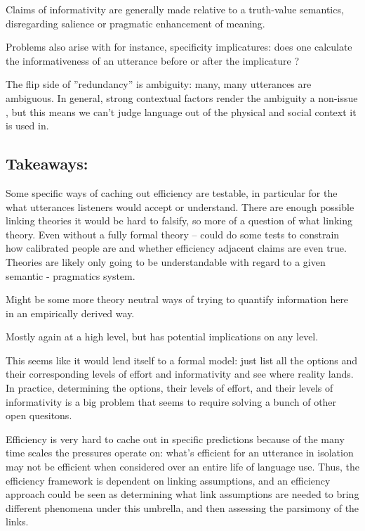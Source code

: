 \documentclass[]{article}
\begin{document}
Claims of informativity are generally made relative to a truth-value semantics, disregarding salience or pragmatic enhancement of meaning. 

Problems also arise with for instance, specificity implicatures: does one calculate the informativeness of an utterance before or after the implicature \cite{bergen}?


The flip side of ''redundancy'' is ambiguity: many, many utterances are ambiguous. In general, strong contextual factors render the ambiguity a non-issue \cite{piantadosi2012}, but this means we can't judge language out of the physical and social context it is used in. 

\subsection{Takeaways:}
Some specific ways of caching out efficiency are testable, in particular for the what utterances listeners would accept or understand. There are enough possible linking theories it would be hard to falsify, so more of a question of what linking theory. 
Even without a fully formal theory -- could do some tests to constrain how calibrated people are and whether efficiency adjacent claims are even true. 
Theories are likely only going to be understandable with regard to a given semantic - pragmatics system. 

Might be some more theory neutral ways of trying to quantify information here in an empirically derived way. 

Mostly again at a high level, but has potential implications on any level. 

This seems like it would lend itself to a formal model: just list all the options and their corresponding levels of effort and informativity and see where reality lands. In practice, determining the options, their levels of effort, and their levels of informativity is a big problem that seems to require solving a bunch of other open quesitons. 

Efficiency is very hard to cache out in specific predictions because of the many time scales the pressures operate on: what's efficient for an utterance in isolation may not be efficient when considered over an entire life of language use. Thus, the efficiency framework is dependent on linking assumptions, and an efficiency approach could be seen as determining what link assumptions are needed to bring different phenomena under this umbrella, and then assessing the parsimony of the links.
\end{document}
